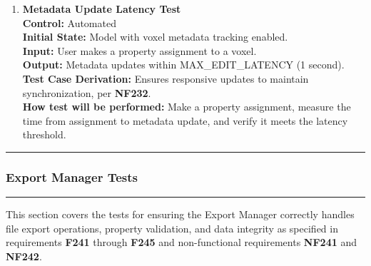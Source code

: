 \documentclass[12pt, titlepage]{article}
\begin{document}
\begin{enumerate}
  \item \textbf{Metadata Update Latency Test} \\[2mm]
    \textbf{Control:} Automated \\ 
    \textbf{Initial State:} Model with voxel metadata tracking enabled. \\ 
    \textbf{Input:} User makes a property assignment to a voxel. \\ 
    \textbf{Output:} Metadata updates within MAX\_EDIT\_LATENCY (1 second). \\[2mm]
    \textbf{Test Case Derivation:} Ensures responsive updates to maintain synchronization, per \textbf{NF232}. \\[2mm]
    \textbf{How test will be performed:} Make a property assignment, measure the time from assignment to metadata update, and verify it meets the latency threshold.

\end{enumerate}

\noindent\rule{\textwidth}{0.5pt}

\subsubsection{Export Manager Tests}
\rule{\textwidth}{0.5pt}

\medskip

\noindent
This section covers the tests for ensuring the Export Manager correctly
handles file export operations, property validation, and data integrity
as specified in requirements \textbf{F241} through \textbf{F245}
and non-functional requirements \textbf{NF241} and \textbf{NF242}.
\end{document}

